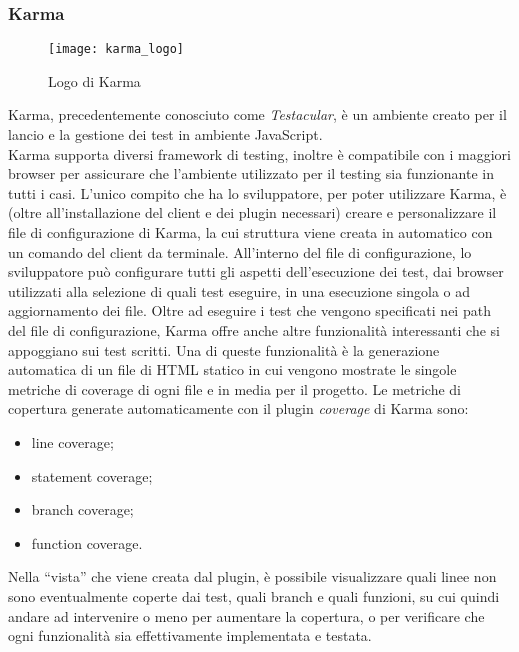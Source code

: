 \subsubsection{Karma}
\begin{figure}[htb] 
    \centering 
    \texttt{[image: karma\_logo]} 
    \caption{Logo di Karma}
\end{figure}
Karma, precedentemente conosciuto come \emph{Testacular}, è un ambiente creato per il lancio e la gestione dei test in ambiente JavaScript.\\
Karma supporta diversi framework di testing, inoltre è compatibile con i maggiori browser per assicurare che l’ambiente utilizzato per il testing sia funzionante in tutti i casi. 
L’unico compito che ha lo sviluppatore, per poter utilizzare Karma, è (oltre all’installazione del client e dei plugin necessari) creare e personalizzare il file di configurazione di Karma, la cui struttura viene creata in automatico con un comando del client da terminale. 
All’interno del file di configurazione, lo sviluppatore può configurare tutti gli aspetti dell’esecuzione dei test, dai browser utilizzati alla selezione di quali test eseguire, in una esecuzione singola o ad aggiornamento dei file. 
Oltre ad eseguire i test che vengono specificati nei path del file di configurazione, Karma offre anche altre funzionalità interessanti che si appoggiano sui test scritti. Una di queste funzionalità è la generazione automatica di un file di HTML statico in cui vengono mostrate le singole metriche di coverage di ogni file e in media per il progetto. Le metriche di copertura generate automaticamente con il plugin \emph{coverage} di Karma sono:
\begin{itemize}
	\item line coverage;
	\item statement coverage;
	\item branch coverage;
	\item function coverage.
\end{itemize}
Nella “vista” che viene creata dal plugin, è possibile visualizzare quali linee non sono eventualmente coperte dai test, quali branch e quali funzioni, su cui quindi andare ad intervenire o meno per aumentare la copertura, o per verificare che ogni funzionalità sia effettivamente implementata e testata.

